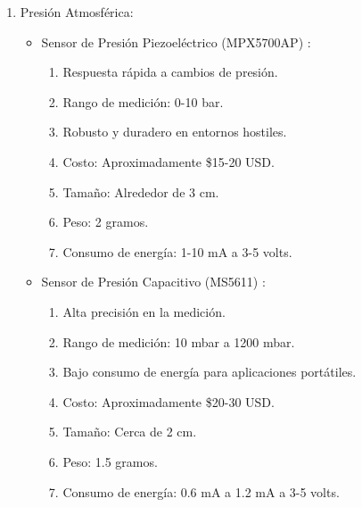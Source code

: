 \begin{enumerate}
\item Presión Atmosférica:
\begin{itemize}
    \item Sensor de Presión Piezoeléctrico (MPX5700AP) \cite{90}:
\begin{enumerate}
        \item Respuesta rápida a cambios de presión.
        \item Rango de medición: 0-10 bar.
        \item Robusto y duradero en entornos hostiles.
        \item Costo: Aproximadamente \$15-20 USD.
        \item Tamaño: Alrededor de 3 cm.
        \item Peso: 2 gramos.
        \item Consumo de energía: 1-10 mA a 3-5 volts.
\end{enumerate}
    \item Sensor de Presión Capacitivo (MS5611) \cite{91}:
\begin{enumerate}
        \item Alta precisión en la medición.
        \item Rango de medición: 10 mbar a 1200 mbar.
        \item Bajo consumo de energía para aplicaciones portátiles.
        \item Costo: Aproximadamente \$20-30 USD.
        \item Tamaño: Cerca de 2 cm.
        \item Peso: 1.5 gramos.
        \item Consumo de energía: 0.6 mA a 1.2 mA a 3-5 volts.

\end{enumerate}
\end{itemize}


\end{enumerate}

